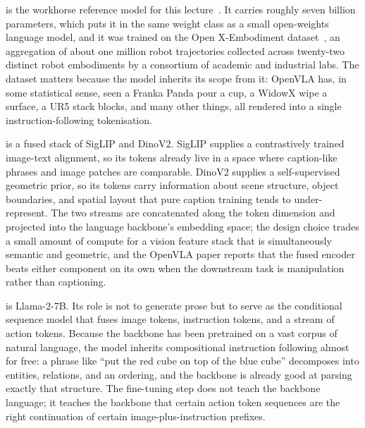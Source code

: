 \vspace{1.5em}

 is the workhorse reference model for this lecture~\cite{Kim2024OpenVLA}. It carries roughly seven billion parameters, which puts it in the same weight class as a small open-weights language model, and it was trained on the Open X-Embodiment dataset~\cite{Padalkar2024OpenXEmbodiment}, an aggregation of about one million robot trajectories collected across twenty-two distinct robot embodiments by a consortium of academic and industrial labs. The dataset matters because the model inherits its scope from it: OpenVLA has, in some statistical sense, seen a Franka Panda pour a cup, a WidowX wipe a surface, a UR5 stack blocks, and many other things, all rendered into a single instruction-following tokenisation.

 is a fused stack of SigLIP and DinoV2. SigLIP supplies a contrastively trained image-text alignment, so its tokens already live in a space where caption-like phrases and image patches are comparable. DinoV2 supplies a self-supervised geometric prior, so its tokens carry information about scene structure, object boundaries, and spatial layout that pure caption training tends to under-represent. The two streams are concatenated along the token dimension and projected into the language backbone's embedding space; the design choice trades a small amount of compute for a vision feature stack that is simultaneously semantic and geometric, and the OpenVLA paper reports that the fused encoder beats either component on its own when the downstream task is manipulation rather than captioning.

 is Llama-2-7B. Its role is not to generate prose but to serve as the conditional sequence model that fuses image tokens, instruction tokens, and a stream of action tokens. Because the backbone has been pretrained on a vast corpus of natural language, the model inherits compositional instruction following almost for free: a phrase like ``put the red cube on top of the blue cube'' decomposes into entities, relations, and an ordering, and the backbone is already good at parsing exactly that structure. The fine-tuning step does not teach the backbone language; it teaches the backbone that certain action token sequences are the right continuation of certain image-plus-instruction prefixes.


